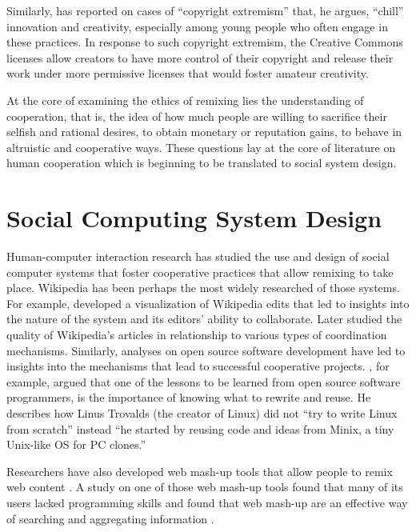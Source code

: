 Similarly, \citet{lessig_remix:_2008} has reported on cases of ``copyright extremism'' that, he argues, ``chill''
 innovation and creativity, especially among young people who often engage in these practices.
In response to such copyright extremism, the Creative Commons licenses allow creators to have more control of their copyright and release their work under more permissive licenses that would foster amateur creativity.

At the core of examining the ethics of remixing lies the understanding of cooperation, that is, the idea of how much people are willing to sacrifice their selfish and rational desires, to obtain monetary or reputation gains, to behave in altruistic and cooperative ways. 
These questions lay at the core of literature on human cooperation which is beginning to be translated to social system design.

\section{Social Computing System Design}

Human-computer interaction research has studied the use and design of social computer systems that foster cooperative practices that allow remixing to take place.
Wikipedia has been perhaps the most widely researched of those systems. 
For example, \citet{viegas_studying_2004} developed a visualization of Wikipedia edits that led to insights into the nature of the system and its editors' ability to collaborate. 
Later \citet{kittur_harnessing_2008} studied the quality of Wikipedia's articles in relationship to various types of coordination mechanisms.
Similarly, analyses on open source software development have led to insights into the mechanisms that lead to successful cooperative projects. 
\citet{raymond_cathedral_1999}, for example, argued that one of the lessons to be learned from open source software programmers, is the importance of knowing what to rewrite and reuse. 
He describes how Linus Trovalds (the creator of Linux) did not ``try to write Linux from scratch'' instead ``he started by reusing code and ideas from Minix, a tiny Unix-like OS for PC clones.'' 

Researchers have also developed web mash-up tools that allow people to remix web content \citep{bolin_automation_2005,wong_making_2007}.
A study on one of those web mash-up tools found that many of its users lacked programming skills and found that web mash-up are an effective way of searching and aggregating information \citep{nan_zang_whats_2008}.

